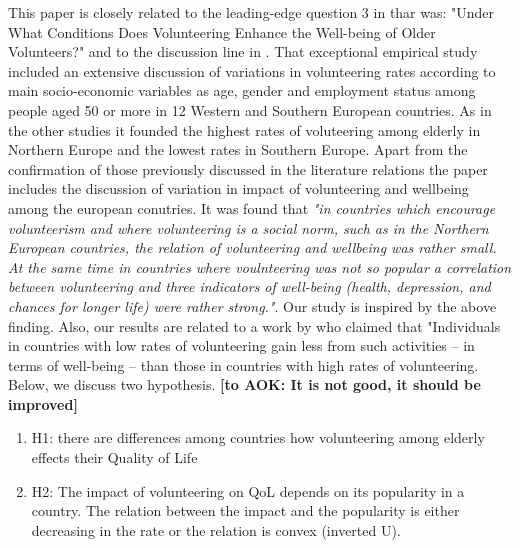 \documentclass[10pt, letterpaper]{article}
\begin{document}
\begin{spacing}{1.4}
This paper is closely related to the leading-edge question 3 in \citet{morrow10} thar was: "Under What Conditions Does Volunteering Enhance the Well-being of Older Volunteers?" and to the discussion line in \citet{haski09}. That exceptional empirical study included an extensive discussion of variations in volunteering rates according to main socio-economic variables as age, gender and employment status among people aged 50 or more in 12 Western and Southern European countries. As in the other studies it founded the highest rates of voluteering among elderly in Northern Europe and the lowest rates in Southern Europe. Apart from the confirmation of those previously discussed in the literature relations the paper includes the discussion of variation in impact of volunteering and wellbeing among the european conutries. It was found that \textit{"in countries which encourage volunteerism and where volunteering is a social norm, such as in the Northern European countries, the relation of volunteering and wellbeing was rather small. At the same time in countries where voulnteering was not so popular  a correlation between volunteering and three indicators of well-being (health, depression, and chances for longer life) were rather strong."}.  Our study is inspired by the above finding. Also, our results are related to a work by \citet{plagnol10} who claimed that "Individuals in countries with low rates of volunteering gain less from such activities – in terms of well-being – than those in countries with high rates of volunteering. Below, we discuss two hypothesis. \textbf{[to AOK: It is not good, it should be improved]} \\

\begin{enumerate}
\item H1: there are differences among countries how volunteering among elderly effects their Quality of Life 
\item H2: The impact of volunteering on QoL depends on its popularity in a country. The relation between the impact and the popularity is either decreasing in the rate or the relation is convex (inverted U).
\end{enumerate}


\end{spacing}
\end{document}
